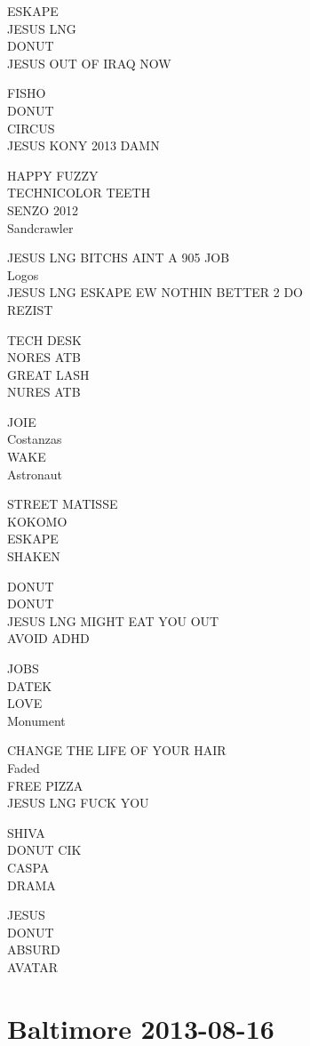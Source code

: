 \documentclass[10pt,letterpaper]{article}
\begin{document}
ESKAPE\\
JESUS LNG\\
DONUT\\
JESUS OUT OF IRAQ NOW

FISHO\\
DONUT\\
CIRCUS\\
JESUS KONY 2013 DAMN

HAPPY FUZZY\\
TECHNICOLOR TEETH\\
SENZO 2012\\
Sandcrawler

JESUS LNG BITCHS AINT A 905 JOB\\
Logos\\
JESUS LNG ESKAPE EW NOTHIN BETTER 2 DO\\
REZIST

TECH DESK\\
NORES ATB\\
GREAT LASH\\
NURES ATB

JOIE\\
Costanzas\\
WAKE\\
Astronaut

STREET MATISSE\\
KOKOMO\\
ESKAPE\\
SHAKEN

DONUT\\
DONUT\\
JESUS LNG MIGHT EAT YOU OUT\\
AVOID ADHD

JOBS\\
DATEK\\
LOVE\\
Monument

CHANGE THE LIFE OF YOUR HAIR\\
Faded\\
FREE PIZZA\\
JESUS LNG FUCK YOU

SHIVA\\
DONUT CIK\\
CASPA\\
DRAMA

JESUS\\
DONUT\\
ABSURD\\
AVATAR


\section*{Baltimore 2013-08-16}
\end{document}
